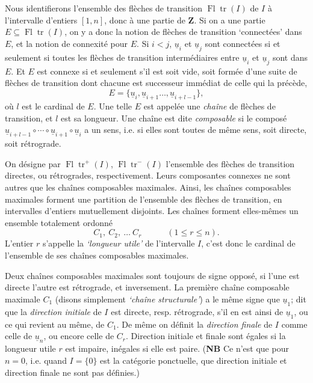 \documentclass[11pt]{article}
\newcommand{\printedpage}[1]{\if\relax\detokenize{#1}\relax\else\marginpar{\raggedright\footnotesize p.~#1}\fi}
\newcommand{\msp}[1]{\marginpar{\raggedright\footnotesize [#1]}}
\newcommand{\Fltr}{\operatorname{Fl}\operatorname{tr}}
\begin{document}
Nous identifierons l'ensemble des flèches de transition $\Fltr(I)$ de $I$ à l'intervalle d'entiers $[1,n]$, donc à une partie de $\mathbf{Z}$. Si on a une partie $E\subseteq\Fltr(I)$, on y a donc la notion de flèches de transition ‘connectées’ dans $E$, et la notion de connexité pour $E$. Si $i<j$, $\underline{u}_i$ et $\underline{u}_j$ sont connectées si et seulement si toutes les flèches de transition intermédiaires entre $\underline{u}_i$ et $\underline{u}_j$ sont dans $E$. Et $E$ est connexe si et seulement s'il est soit vide, soit formée d'une suite de flèches de transition dont chacune est successeur immédiat de celle qui la précède, %
\[
E=\{\underline{u}_i,\underline{u}_{i+1}\ldots,\underline{u}_{i+l-1}\}, %
\]
où $l$ est le cardinal de $E$. Une telle $E$ est appelée une \textit{chaîne} de flèches de transition, et $l$ est sa longueur. Une chaîne est dite \textit{composable} si le composé $\underline{u}_{i+l-1}\circ\cdots\circ\underline{u}_{i+1}\circ\underline{u}_i$ a un sens, i.e. si elles sont toutes de même sens, soit directe, soit rétrograde.

On désigne par $\Fltr^+(I)$, $\Fltr^-(I)$ l'ensemble des flèches de transition directes, ou rétrogrades, respectivement. Leurs composantes connexes ne sont autres que les chaînes composables maximales. Ainsi, les chaînes composables maximales forment une partition de l'ensemble des flèches de transition, en intervalles d'entiers mutuellement disjoints. Les chaînes forment elles-mêmes un ensemble totalement ordonné
\[
C_1,\ C_2,\ \ldots\ C_r\qquad\quad(1\leq r\leq n).
\]
L'entier $r$ s'appelle la \textit{‘longueur utile’} de l'intervalle
\msp{page 4}
$I$, c'est donc le cardinal de l'ensemble de ses chaînes composables maximales.

Deux chaînes composables maximales sont toujours de signe opposé, si l'une est directe l'autre est rétrograde, et inversement. La première chaîne composable maximale $C_1$ (disons simplement \textit{‘chaîne structurale’}) a le même signe que $\underline{u}_1$; dit que la \textit{direction initiale} de $I$ est directe, resp. rétrograde, s'il en est ainsi de $\underline{u}_1$, ou ce qui revient au même, de $C_1$. De même on définit la \textit{direction finale} de $I$ comme celle de $\underline{u}_n$, ou encore celle de $C_r$. Direction initiale et finale sont égales si la longueur utile $r$ est
\printedpage{3}
impaire, inégales si elle est paire. (\textbf{NB} Ce n'est que pour $n=0$, i.e. quand $I=\{0\}$ est la catégorie ponctuelle, que direction initiale et direction finale ne sont pas définies.)
\end{document}
